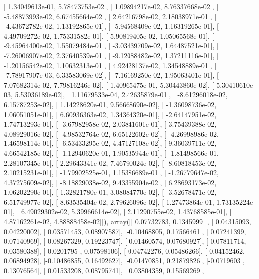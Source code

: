 \documentclass{article}
\begin{document}
       [  1.34049613e-01,   5.78473753e-02],
       [  1.09894217e-02,   8.76337668e-02],
       [ -5.48873993e-02,   6.67455664e-02],
       [  2.64216798e-02,   2.18038971e-01],
       [ -4.43672782e-02,   1.13192865e-01],
       [ -5.94568409e-02,   1.16319265e-01],
       [  4.49709272e-02,   1.75331582e-01],
       [  5.90819405e-02,   1.05065568e-01],
       [ -9.45964400e-02,   1.55079484e-01],
       [ -3.03439709e-02,   1.64487521e-01],
       [ -7.26006907e-02,   2.37640539e-01],
       [ -9.12088482e-02,   1.37211116e-01],
       [ -1.20156542e-02,   1.10632313e-01],
       [  4.92428137e-02,   1.34548889e-01],
       [ -7.78917907e-03,   6.33583069e-02],
       [ -7.16169250e-02,   1.95063401e-01],
       [  7.07682314e-02,   7.79816246e-02],
       [  1.40965475e-01,   5.30443860e-02],
       [  5.30410610e-03,   5.53036189e-02],
       [  1.11679533e-04,   2.42635879e-01],
       [ -8.61296018e-02,   6.15787253e-02],
       [  1.14228620e-01,   9.56668690e-02],
       [ -1.36098736e-02,   1.06051051e-01],
       [  6.60936363e-02,   1.34364320e-01],
       [ -2.64147951e-02,   1.74713293e-01],
       [ -3.67982958e-02,   2.03841601e-01],
       [  3.75439388e-02,   4.08929016e-02],
       [ -4.98532764e-02,   6.65122602e-02],
       [ -4.26998986e-02,   1.46598114e-01],
       [ -6.53433295e-02,   4.47127108e-02],
       [  9.36039711e-02,   4.66542185e-02],
       [ -1.12940620e-01,   1.90535944e-01],
       [ -1.81498566e-01,   2.28107345e-01],
       [  2.29643341e-02,   7.46790024e-02],
       [ -8.60818453e-02,   2.10215231e-01],
       [ -1.79902525e-01,   1.15386689e-01],
       [ -1.26779647e-02,   4.37275609e-02],
       [ -8.18829038e-02,   9.43365904e-02],
       [  6.28693173e-02,   1.06202290e-01],
       [  1.32821780e-01,   3.08084770e-02],
       [ -3.52678471e-02,   6.51749977e-02],
       [  8.63535404e-02,   2.79626096e-02],
       [  1.27473864e-01,   1.73135224e-01],
       [  6.49029302e-02,   5.39966614e-02],
       [  2.11290755e-02,   1.43768585e-01],
       [  4.87162261e-02,   4.88888458e-02]]), array([[ 0.07732783,  0.1345999 ],
       [ 0.04315093,  0.04220002],
       [ 0.03571453,  0.08907587],
       [-0.10468805,  0.17566461],
       [ 0.07241399,  0.07140969],
       [-0.08267329,  0.19223747],
       [ 0.01460574,  0.07680927],
       [ 0.07811714,  0.03580388],
       [-0.0201795 ,  0.07598106],
       [ 0.04742276,  0.05486266],
       [ 0.04152462,  0.06894928],
       [-0.10486855,  0.16492627],
       [-0.01470851,  0.21879826],
       [-0.0719603 ,  0.13076564],
       [ 0.01533208,  0.08795741],
       [ 0.03804359,  0.15569269],
\end{document}
